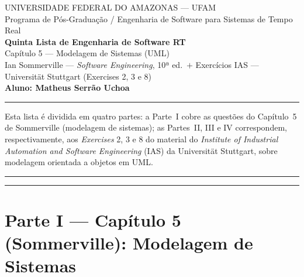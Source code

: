 \documentclass[11pt,a4paper]{article}
\begin{document}

\begin{center}
  {\large UNIVERSIDADE FEDERAL DO AMAZONAS — UFAM}\\[2pt]
  {\normalsize Programa de Pós-Graduação / Engenharia de Software para Sistemas de Tempo Real}\\[10pt]
  {\Large\bfseries Quinta Lista de Engenharia de Software RT}\\[5pt]
  {\large Capítulo 5 — Modelagem de Sistemas (UML)}\\[3pt]
  {\normalsize Ian Sommerville — \textit{Software Engineering}, 10ª ed.\ \;$+$\;
   Exercícios IAS — Universität Stuttgart (Exercises 2, 3 e 8)}\\[8pt]
  {\normalsize\bfseries Aluno: Matheus Serrão Uchoa}
\end{center}
\hrule\vspace{4pt}
{\small Esta lista é dividida em quatro partes: a Parte~I cobre as questões do
Capítulo~5 de Sommerville (modelagem de sistemas); as Partes~II, III e IV
correspondem, respectivamente, aos \textit{Exercises} 2, 3 e 8 do material do
\textit{Institute of Industrial Automation and Software Engineering} (IAS) da
Universität Stuttgart, sobre modelagem orientada a objetos em UML.}
\vspace{4pt}\hrule

\tableofcontents
\vspace{6pt}\hrule

\section{Parte I — Capítulo 5 (Sommerville): Modelagem de Sistemas}

\end{document}
